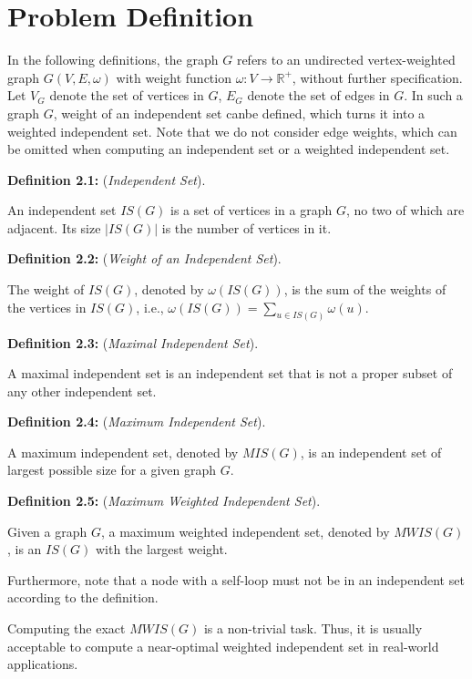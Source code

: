 \documentclass[sigconf, nonacm]{acmart}
\begin{document}
\section{Problem Definition}

In the following definitions, the graph $G$ refers to an undirected vertex-weighted graph $G(V,E,\omega)$ with weight function $\omega: V\to\mathbb{R}^+$, without further specification. Let $V_G$ denote the set of vertices in $G$, $E_G$ denote the set of edges in $G$. In such a graph $G$, weight of an independent set canbe defined, which turns it into a weighted independent set. Note that we do not consider edge weights, which can be omitted when computing an independent set or a weighted independent set.

\begin{framed}
\noindent\textbf{Definition 2.1:} (\emph{Independent Set}). 

An independent set $IS(G)$ is a set of vertices in a graph $G$, no two of which are adjacent. Its size $|IS(G)|$ is the number of vertices in it.

\noindent\textbf{Definition 2.2:} (\emph{Weight of an Independent Set}). 

The weight of $IS(G)$, denoted by $\omega(IS(G))$, is the sum of the weights of the vertices in $IS(G)$, i.e., $\omega(IS(G)) = \sum_{u\in IS(G)}\omega(u)$.

\noindent\textbf{Definition 2.3:} (\emph{Maximal Independent Set}). 

A maximal independent set is an independent set that is not a proper subset of any other independent set. 

\noindent\textbf{Definition 2.4:} (\emph{Maximum Independent Set}). 

A maximum independent set, denoted by $MIS(G)$, is an independent set of largest possible size for a given graph $G$.

\noindent\textbf{Definition 2.5:} (\emph{Maximum Weighted Independent Set}). 

Given a graph $G$, a maximum weighted independent set, denoted by $MWIS(G)$, is an $IS(G)$ with the largest weight.
\end{framed}

Furthermore, note that a node with a self-loop must not be in an independent set according to the definition. 

Computing the exact $MWIS(G)$ is a non-trivial task. Thus, it is usually acceptable to compute a near-optimal weighted independent set in real-world applications.
\end{document}
